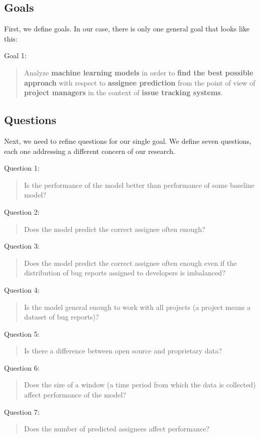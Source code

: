 \subsection{Goals}

First, we define goals. In our case, there is only one general goal that looks like this:

\begin{framed}
  Goal 1:
  \begin{quote}
    Analyze \textbf{machine learning models} in order to \textbf{find the best possible approach} with respect to \textbf{assignee prediction} from the point of view of \textbf{project managers} in the context of \textbf{issue tracking systems}.
  \end{quote}
\end{framed}

\subsection{Questions}

Next, we need to refine questions for our single goal. We define seven questions, each one addressing a different concern of our research.

\begin{framed}
  Question 1:
  \begin{quote}
    Is the performance of the model better than performance of some baseline model?
  \end{quote}

  Question 2:
  \begin{quote}
    Does the model predict the correct assignee often enough?
  \end{quote}

  Question 3:
  \begin{quote}
    Does the model predict the correct assignee often enough even if the distribution of bug reports assigned to developers is imbalanced?
  \end{quote}

  Question 4:
  \begin{quote}
    Is the model general enough to work with all projects (a project means a dataset of bug reports)?
  \end{quote}

  Question 5:
  \begin{quote}
    Is there a difference between open source and proprietary data?
  \end{quote}

  Question 6:
  \begin{quote}
    Does the size of a window (a time period from which the data is collected) affect performance of the model?
  \end{quote}

  Question 7:
  \begin{quote}
    Does the number of predicted assignees affect performance?
  \end{quote}

\end{framed}


